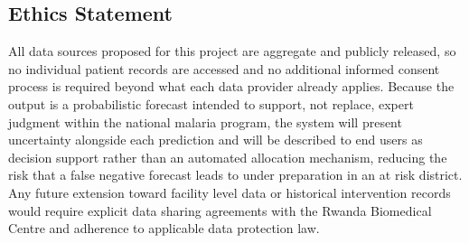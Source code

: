 \documentclass[11pt]{article}
\begin{document}
\subsection*{Ethics Statement}
All data sources proposed for this project are aggregate and publicly released, so no individual patient records are accessed and no additional informed consent process is required beyond what each data provider already applies. Because the output is a probabilistic forecast intended to support, not replace, expert judgment within the national malaria program, the system will present uncertainty alongside each prediction and will be described to end users as decision support rather than an automated allocation mechanism, reducing the risk that a false negative forecast leads to under preparation in an at risk district. Any future extension toward facility level data or historical intervention records would require explicit data sharing agreements with the Rwanda Biomedical Centre and adherence to applicable data protection law.
\end{document}
